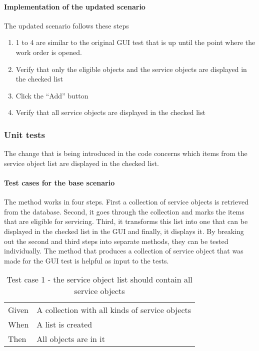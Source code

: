 \documentclass{article}
\begin{document}
				\paragraph{Implementation of the updated scenario}
				The updated scenario follows these steps

				\begin{enumerate}
					\item 1 to 4 are similar to the original GUI test that is up until the point where the work order is opened.
					\setcounter{enumi}{4}
					\item Verify that only the eligible objects and the service objects are displayed in the checked list
					\item Click the “Add” button
					\item Verify that all service objects are displayed in the checked list
				\end{enumerate}

			\subsubsection{Unit tests}
				The change that is being introduced in the code concerns which items from the service object list are displayed in the checked list.
				
				\paragraph{Test cases for the base scenario} 
				The method works in four steps. First a collection of service objects is retrieved from the database.
				Second, it goes through the collection and marks the items that are eligible for servicing. Third, it transforms this list into one that can be displayed in the checked list in the GUI and finally, it displays it.
				By breaking out the second and third steps into separate methods, they can be tested individually.
				The method that produces a collection of service object that was made for the GUI test is helpful as input to the tests.

				\begin{table}[h!]
					\centering
					\begin{tabular}{|p{1cm} p{7cm} |}
					\hline
					Given 	& A collection with all kinds of service objects \\ 
					When 	& A list is created  \\	
					Then 	& All objects are in it \\
					\hline
					\end{tabular}
					\caption{Test case 1 - the service object list should contain all service objects}
				\end{table}
\end{document}
